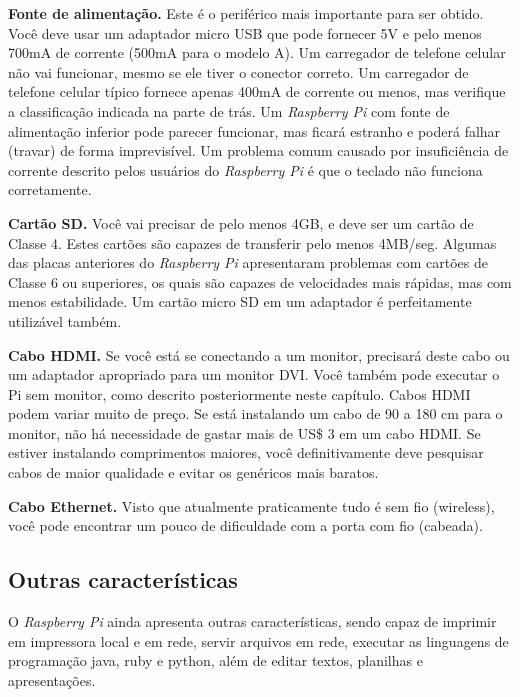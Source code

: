 \textbf{Fonte de alimentação.} Este é o periférico mais importante para ser obtido. Você deve usar um adaptador micro USB que pode fornecer 5V e pelo menos 700mA de corrente (500mA para o modelo A). Um carregador de telefone celular não vai funcionar, mesmo se ele tiver o conector correto. Um carregador de telefone celular típico fornece apenas 400mA de corrente ou menos, mas verifique a classificação indicada na parte de trás. Um \textit{Raspberry Pi} com fonte de alimentação inferior pode parecer funcionar, mas ficará estranho e poderá falhar (travar) de forma imprevisível. Um problema comum causado por insuficiência de corrente descrito pelos usuários do \textit{Raspberry Pi} é que o teclado não funciona corretamente.

\textbf{Cartão SD.} Você vai precisar de pelo menos 4GB, e deve ser um cartão de Classe 4. Estes cartões são capazes de transferir pelo menos 4MB/seg. Algumas das placas anteriores do \textit{Raspberry Pi} apresentaram problemas com cartões de Classe 6 ou superiores, os quais são capazes de velocidades mais rápidas, mas com menos estabilidade. Um cartão micro SD em um adaptador é perfeitamente utilizável também.

\textbf{Cabo HDMI.} Se você está se conectando a um monitor, precisará deste cabo ou um adaptador apropriado para um monitor DVI. Você também pode executar o Pi sem monitor, como descrito posteriormente neste capítulo. Cabos HDMI podem variar muito de preço. Se está instalando um cabo de 90 a 180 cm para o monitor, não há necessidade de gastar mais de US\$ 3 em um cabo HDMI. Se estiver instalando comprimentos maiores, você definitivamente deve pesquisar cabos de maior qualidade e evitar os genéricos mais baratos.

\textbf{Cabo Ethernet.} Visto que atualmente praticamente tudo é sem fio (wireless), você pode encontrar um pouco de dificuldade com a porta com fio (cabeada).

\subsection{Outras características}

O \textit{Raspberry Pi} ainda apresenta outras características, sendo capaz de imprimir em impressora local e em rede, servir arquivos em rede, executar as linguagens de programação java, ruby e python, além de editar textos, planilhas e apresentações.